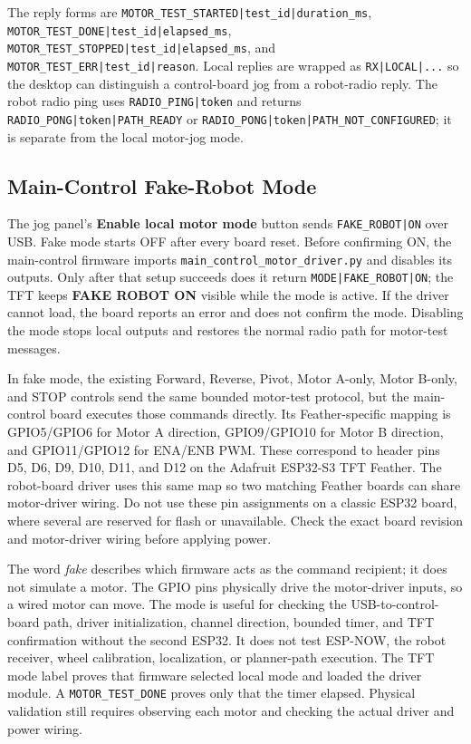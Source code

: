\documentclass{article}
\begin{document}
The reply forms are \texttt{MOTOR\_TEST\_STARTED|test\_id|duration\_ms}, \texttt{MOTOR\_TEST\_DONE|test\_id|elapsed\_ms}, \texttt{MOTOR\_TEST\_STOPPED|test\_id|elapsed\_ms}, and \texttt{MOTOR\_TEST\_ERR|test\_id|reason}. Local replies are wrapped as \texttt{RX|LOCAL|...} so the desktop can distinguish a control-board jog from a robot-radio reply. The robot radio ping uses \texttt{RADIO\_PING|token} and returns \texttt{RADIO\_PONG|token|PATH\_READY} or \texttt{RADIO\_PONG|token|PATH\_NOT\_CONFIGURED}; it is separate from the local motor-jog mode.

\subsection{Main-Control Fake-Robot Mode}

The jog panel's \textbf{Enable local motor mode} button sends \texttt{FAKE\_ROBOT|ON} over USB. Fake mode starts OFF after every board reset. Before confirming ON, the main-control firmware imports \texttt{main\_control\_motor\_driver.py} and disables its outputs. Only after that setup succeeds does it return \texttt{MODE|FAKE\_ROBOT|ON}; the TFT keeps \textbf{FAKE ROBOT ON} visible while the mode is active. If the driver cannot load, the board reports an error and does not confirm the mode. Disabling the mode stops local outputs and restores the normal radio path for motor-test messages.

In fake mode, the existing Forward, Reverse, Pivot, Motor A-only, Motor B-only, and STOP controls send the same bounded motor-test protocol, but the main-control board executes those commands directly. Its Feather-specific mapping is GPIO5/GPIO6 for Motor A direction, GPIO9/GPIO10 for Motor B direction, and GPIO11/GPIO12 for ENA/ENB PWM. These correspond to header pins D5, D6, D9, D10, D11, and D12 on the Adafruit ESP32-S3 TFT Feather. The robot-board driver uses this same map so two matching Feather boards can share motor-driver wiring. Do not use these pin assignments on a classic ESP32 board, where several are reserved for flash or unavailable. Check the exact board revision and motor-driver wiring before applying power.

The word \emph{fake} describes which firmware acts as the command recipient; it does not simulate a motor. The GPIO pins physically drive the motor-driver inputs, so a wired motor can move. The mode is useful for checking the USB-to-control-board path, driver initialization, channel direction, bounded timer, and TFT confirmation without the second ESP32. It does not test ESP-NOW, the robot receiver, wheel calibration, localization, or planner-path execution. The TFT mode label proves that firmware selected local mode and loaded the driver module. A \texttt{MOTOR\_TEST\_DONE} proves only that the timer elapsed. Physical validation still requires observing each motor and checking the actual driver and power wiring.
\end{document}
